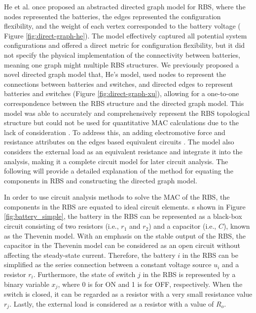 \documentclass{article}
\begin{document}
He et al. \cite{heExploringAdaptiveReconfiguration2013} once proposed an abstracted directed graph model for RBS, where the nodes represented the batteries, the edges represented the configuration flexibility, and the weight of each vertex corresponded to the battery voltage ( Figure \ref{fig:direct-graph-he}). 
The model effectively captured all potential system configurations and offered a direct metric for configuration flexibility, but it did not specify the physical implementation of the connectivity between batteries, meaning one graph might  multiple RBS structures.
We previously proposed a novel directed graph model that,  He's model, used nodes to represent the connections between batteries and switches, and directed edges to represent batteries and switches (Figure \ref{fig:direct-graph-xu}), allowing for a one-to-one correspondence between the RBS structure and the directed graph model. 
This model was able to accurately and comprehensively represent the RBS topological structure but could not be used for quantitative MAC calculations due to the lack of consideration  . 
To address this, an  adding electromotive force and resistance attributes on the edges based  equivalent circuits .
The model also considers the external load as an equivalent resistance and integrate it into the analysis, making it a complete circuit model for later circuit analysis.
The following will provide a detailed explanation of the method for equating the components in RBS and constructing the directed graph model.


In order to use circuit analysis methods to solve the MAC of the RBS, the components in the RBS are equated to ideal circuit elements.
 s shown in Figure \ref{fig:battery_simple}, the battery in the RBS can be represented as a black-box circuit consisting of two resistors (i.e., $r_1$ and $r_2$) and a capacitor (i.e., $C$), known as the Thevenin model\cite{hongwenheStateofChargeEstimationLithiumIon2011,mousavig.VariousBatteryModels2014}.
With an emphasis on the stable output of the RBS, the capacitor in the Thevenin model can be considered as an open circuit without affecting the steady-state current.
Therefore, the battery $i$ in the RBS can be simplified as the series connection between a constant voltage source $u_{i}$ and a resistor $r_{i}$.
Furthermore, the state of switch $j$ in the RBS is represented by a binary variable $x_j$, where 0 is for ON and 1 is for OFF, respectively.
When the switch is closed, it can be regarded as a resistor with a very small resistance value $r_{j}$.
Lastly, the external load is considered as a resistor with a value of $R_o$.
\end{document}
